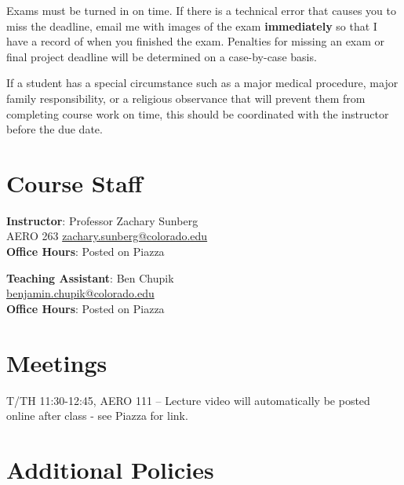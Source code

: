 \documentclass[9pt]{article}
\begin{document}
Exams must be turned in on time. If there is a technical error that causes you to miss the deadline, email me with images of the exam \textbf{immediately} so that I have a record of when you finished the exam. Penalties for missing an exam or final project deadline will be determined on a case-by-case basis.

If a student has a special circumstance such as a major medical procedure, major family responsibility, or a religious observance that will prevent them from completing course work on time, this should be coordinated with the instructor before the due date.

\section*{Course Staff}

\begin{multicols}{2}
    \begin{minipage}{\columnwidth}
        \textbf{Instructor}: Professor Zachary Sunberg\\
        AERO 263 \href{mailto://zachary.sunberg@colorado.edu}{zachary.sunberg@colorado.edu}\\
        \textbf{Office Hours}: Posted on Piazza
    \end{minipage}

    \begin{minipage}{\columnwidth}
        \textbf{Teaching Assistant}: Ben Chupik\\
        \href{mailto://benjamin.chupik@colorado.edu}{benjamin.chupik@colorado.edu}\\
        \textbf{Office Hours}: Posted on Piazza
    \end{minipage}
\end{multicols}

\section*{Meetings}

T/TH 11:30-12:45, AERO 111 -- Lecture video will automatically be posted online after class - see Piazza for link.

\section*{Additional Policies}

{\small
    
}
\end{document}
